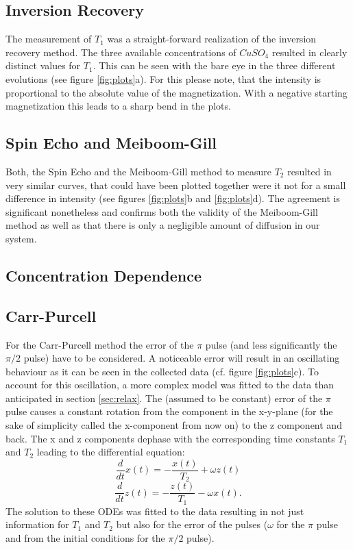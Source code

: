 \documentclass[a4paper]{scrartcl}
\numberwithin{equation}{section}
\numberwithin{figure}{section}
\numberwithin{table}{section}
\newcommand{\eq}[2]{\begin{equation}#1\label{#2}\end{equation}}
\begin{document}
\subsection{Inversion Recovery}
The measurement of $T_1$ was a straight-forward realization of the inversion recovery method. The three available concentrations of $CuSO_4$ resulted in clearly distinct values for $T_1$. This can be seen with the bare eye in the three different evolutions (see figure \ref{fig:plots}a). For this please note, that the intensity is proportional to the absolute value of the magnetization. With a negative starting magnetization this leads to a sharp bend in the plots.

\subsection{Spin Echo and Meiboom-Gill}
Both, the Spin Echo and the Meiboom-Gill method to measure $T_2$ resulted in very similar curves, that could have been plotted together were it not for a small difference in intensity (see figures \ref{fig:plots}b and \ref{fig:plots}d). The agreement is significant nonetheless and confirms both the validity of the Meiboom-Gill method as well as that there is only a negligible amount of diffusion in our system.

\subsection{Concentration Dependence}


\subsection{Carr-Purcell}
For the Carr-Purcell method the error of the $\pi$ pulse (and less significantly the $\pi/2$ pulse) have to be considered. A noticeable error will result in an oscillating behaviour as it can be seen in the collected data (cf. figure \ref{fig:plots}c). To account for this oscillation, a more complex model was fitted to the data than anticipated in section \ref{sec:relax}. The (assumed to be constant) error of the $\pi$ pulse causes a constant rotation from the component in the x-y-plane (for the sake of simplicity called the x-component from now on) to the z component and back. The x and z components dephase with the corresponding time constants $T_1$ and $T_2$ leading to the differential equation:
\eq{\frac{d}{dt}x(t) = -\frac{x(t)}{T_2} + \omega z(t)}{}
\eq{\frac{d}{dt}z(t) = -\frac{z(t)}{T_1} - \omega x(t) .}{}
The solution to these ODEs was fitted to the data resulting in not just information for $T_1$ and $T_2$ but also for the error of the pulses ($\omega$ for the $\pi$ pulse and from the initial conditions for the $\pi/2$ pulse).
\end{document}
